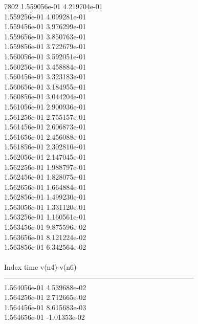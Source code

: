 7802	1.559056e-01	4.219704e-01	\\ 	1.559256e-01	4.099281e-01	\\ 	1.559456e-01	3.976299e-01	\\ 	1.559656e-01	3.850763e-01	\\ 	1.559856e-01	3.722679e-01	\\ 	1.560056e-01	3.592051e-01	\\ 	1.560256e-01	3.458884e-01	\\ 	1.560456e-01	3.323183e-01	\\ 	1.560656e-01	3.184955e-01	\\ 	1.560856e-01	3.044204e-01	\\ 	1.561056e-01	2.900936e-01	\\ 	1.561256e-01	2.755157e-01	\\ 	1.561456e-01	2.606873e-01	\\ 	1.561656e-01	2.456088e-01	\\ 	1.561856e-01	2.302810e-01	\\ 	1.562056e-01	2.147045e-01	\\ 	1.562256e-01	1.988797e-01	\\ 	1.562456e-01	1.828075e-01	\\ 	1.562656e-01	1.664884e-01	\\ 	1.562856e-01	1.499230e-01	\\ 	1.563056e-01	1.331120e-01	\\ 	1.563256e-01	1.160561e-01	\\ 	1.563456e-01	9.875596e-02	\\ 	1.563656e-01	8.121224e-02	\\ 	1.563856e-01	6.342564e-02	\\ \hline
\\ \hline
Index   time            v(n4)-v(n6)     \\ \hline
--------------------------------------------------------------------------------\\ 	1.564056e-01	4.539688e-02	\\ 	1.564256e-01	2.712665e-02	\\ 	1.564456e-01	8.615683e-03	\\ 	1.564656e-01	-1.01353e-02	\\ \hline
